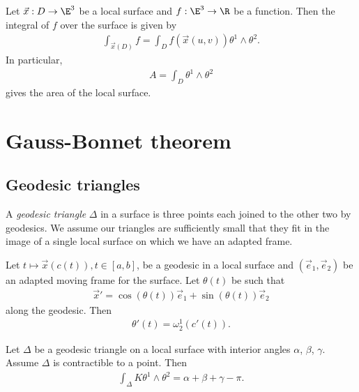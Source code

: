 \documentclass{article}
\begin{document}
\begin{corollary}[Notes 14.17]
	Let $\vec x: D\to\E^3$ be a local surface and $f:\E^3\to\R$ be a function. Then
	the integral of $f$ over the surface is given by
	\begin{align*}
		\int_{\vec x(D)} f = \int_D f(\vec x(u,v))\theta^1\wedge\theta^2.
	\end{align*}
	In particular,
	\begin{align*}
		A = \int_D \theta^1\wedge\theta^2
	\end{align*}
	gives the area of the local surface.
\end{corollary}

\section{Gauss-Bonnet theorem}

\subsection{Geodesic triangles}

\begin{definition}
	A \emph{geodesic triangle} $\Delta$ in a surface is three points each joined to the other
	two by geodesics. We assume our triangles are sufficiently small that they fit in the image
	of a single local surface on which we have an adapted frame.
\end{definition}

\begin{proposition}[Notes 15.2]
	Let $t\mapsto \vec x(c(t)), t\in[a,b]$, be a geodesic in a local surface and $(\vec e_1, \vec e_2)$
	be an adapted moving frame for the surface. Let $\theta(t)$ be such that
	\begin{align*}
		\vec x' = \cos(\theta(t)) \vec e_1 + \sin(\theta(t)) \vec e_2
	\end{align*}
	along the geodesic. Then
	\begin{align*}
		\theta'(t) = \omega_2^1 (c'(t)).
	\end{align*}
\end{proposition}

\begin{theorem}[Notes 15.3]
	Let $\Delta$ be a geodesic triangle on a local surface with interior angles $\alpha$, $\beta$,
	$\gamma$. Assume $\Delta$ is contractible to a point. Then
	\begin{align*}
		\int_\Delta K\theta^1\wedge\theta^2 = \alpha + \beta + \gamma - \pi.
	\end{align*}
\end{theorem}
\end{document}
